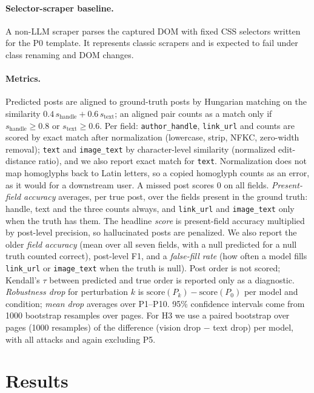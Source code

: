 \documentclass[letterpaper,10pt,twocolumn]{article}
\begin{document}
\paragraph{Selector-scraper baseline.}
A non-LLM scraper parses the captured DOM with fixed CSS selectors written for
the P0 template. It represents classic scrapers and is expected to fail under
class renaming and DOM changes.

\paragraph{Metrics.}
Predicted posts are aligned to ground-truth posts by Hungarian matching on the
similarity $0.4\,s_{\text{handle}}+0.6\,s_{\text{text}}$; an aligned pair
counts as a match only if $s_{\text{handle}}\geq0.8$ or
$s_{\text{text}}\geq0.6$. Per field: \texttt{author\_handle},
\texttt{link\_url} and counts are scored by exact match after normalization
(lowercase, strip, NFKC, zero-width removal); \texttt{text} and
\texttt{image\_text} by character-level similarity (normalized edit-distance
ratio), and we also report exact match for \texttt{text}. Normalization does
not map homoglyphs back to Latin letters, so a copied homoglyph counts as an
error, as it would for a downstream user. A missed post scores 0 on all fields.
\emph{Present-field accuracy} averages, per true post, over the fields present
in the ground truth: handle, text and the three counts always, and
\texttt{link\_url} and \texttt{image\_text} only when the truth has them. The
headline \emph{score} is present-field accuracy multiplied by post-level
precision, so hallucinated posts are penalized. We also report the older
\emph{field accuracy} (mean over all seven fields, with a null predicted for a
null truth counted correct), post-level F1, and a \emph{false-fill rate} (how
often a model fills \texttt{link\_url} or \texttt{image\_text} when the truth is
null). Post order is not scored; Kendall's $\tau$ between predicted and true
order is reported only as a diagnostic. \emph{Robustness drop} for
perturbation $k$ is $\text{score}(P_k)-\text{score}(P_0)$ per model and
condition; \emph{mean drop} averages over P1--P10. 95\% confidence intervals
come from 1000 bootstrap resamples over pages. For H3 we use a paired bootstrap
over pages (1000 resamples) of the difference (vision drop $-$ text drop) per
model, with all attacks and again excluding P5.

\section{Results}
\end{document}
